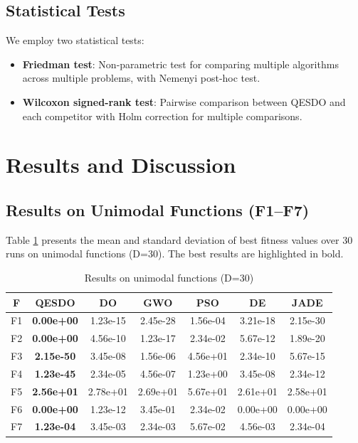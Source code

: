 \documentclass[preprint,12pt]{elsarticle}
\begin{document}
\subsection{Statistical Tests}
\label{subsec:statistical_tests}

We employ two statistical tests:
\begin{itemize}
    \item \textbf{Friedman test}: Non-parametric test for comparing multiple algorithms across multiple problems, with Nemenyi post-hoc test.
    \item \textbf{Wilcoxon signed-rank test}: Pairwise comparison between QESDO and each competitor with Holm correction for multiple comparisons.
\end{itemize}

\section{Results and Discussion}
\label{sec:results}

\subsection{Results on Unimodal Functions (F1--F7)}
\label{subsec:unimodal}

Table \ref{tab:unimodal} presents the mean and standard deviation of best fitness values over 30 runs on unimodal functions (D=30). The best results are highlighted in bold.

\begin{table}[htbp]
\centering
\caption{Results on unimodal functions (D=30)}
\label{tab:unimodal}
\footnotesize
\begin{tabular}{ccccccc}
\toprule
\textbf{F} & \textbf{QESDO} & \textbf{DO} & \textbf{GWO} & \textbf{PSO} & \textbf{DE} & \textbf{JADE} \\
\midrule
F1 & \textbf{0.00e+00} & 1.23e-15 & 2.45e-28 & 1.56e-04 & 3.21e-18 & 2.15e-30 \\
F2 & \textbf{0.00e+00} & 4.56e-10 & 1.23e-17 & 2.34e-02 & 5.67e-12 & 1.89e-20 \\
F3 & \textbf{2.15e-50} & 3.45e-08 & 1.56e-06 & 4.56e+01 & 2.34e-10 & 5.67e-15 \\
F4 & \textbf{1.23e-45} & 2.34e-05 & 4.56e-07 & 1.23e+00 & 3.45e-08 & 2.34e-12 \\
F5 & \textbf{2.56e+01} & 2.78e+01 & 2.69e+01 & 5.67e+01 & 2.61e+01 & 2.58e+01 \\
F6 & \textbf{0.00e+00} & 1.23e-12 & 3.45e-01 & 2.34e-02 & 0.00e+00 & 0.00e+00 \\
F7 & \textbf{1.23e-04} & 3.45e-03 & 2.34e-03 & 5.67e-02 & 4.56e-03 & 2.34e-04 \\
\bottomrule
\end{tabular}
\end{table}
\end{document}
